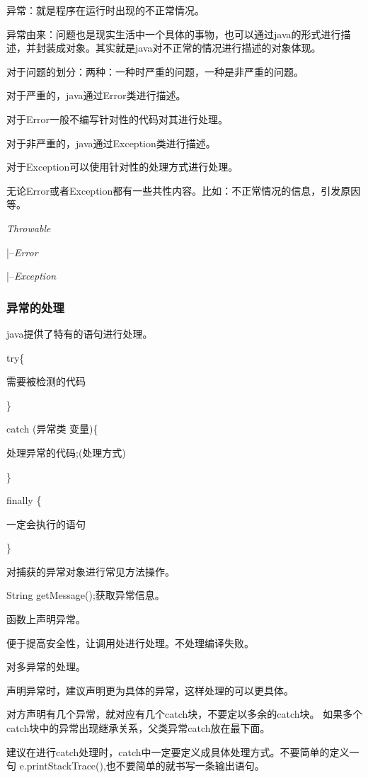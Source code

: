 \documentclass[UTF8]{ctexart}
\begin{document}
异常：就是程序在运行时出现的不正常情况。

异常由来：问题也是现实生活中一个具体的事物，也可以通过java的形式进行描述，并封装成对象。其实就是java对不正常的情况进行描述的对象体现。

对于问题的划分：两种：一种时严重的问题，一种是非严重的问题。

\textbullet 对于严重的，java通过Error类进行描述。

\qquad 对于Error一般不编写针对性的代码对其进行处理。

\textbullet 对于非严重的，java通过Exception类进行描述。

\qquad 对于Exception可以使用针对性的处理方式进行处理。

无论Error或者Exception都有一些共性内容。比如：不正常情况的信息，引发原因等。

\textit{Throwable}

\qquad |--\textit{Error}

\qquad |--\textit{Exception}
\subsubsection{异常的处理}

\textbullet java提供了特有的语句进行处理。

try\{

\qquad 需要被检测的代码

\}

catch (异常类 变量)\{

\qquad 处理异常的代码;(处理方式)

\}

finally \{

\qquad 一定会执行的语句

\}

\textbullet 对捕获的异常对象进行常见方法操作。

\qquad String getMessage();获取异常信息。

函数上声明异常。

便于提高安全性，让调用处进行处理。不处理编译失败。

对多异常的处理。

\textbullet 声明异常时，建议声明更为具体的异常，这样处理的可以更具体。

\textbullet 对方声明有几个异常，就对应有几个catch块，不要定以多余的catch块。
如果多个catch块中的异常出现继承关系，父类异常catch放在最下面。

建议在进行catch处理时，catch中一定要定义成具体处理方式。不要简单的定义一句 e.printStackTrace(),也不要简单的就书写一条输出语句。

\end{document}
